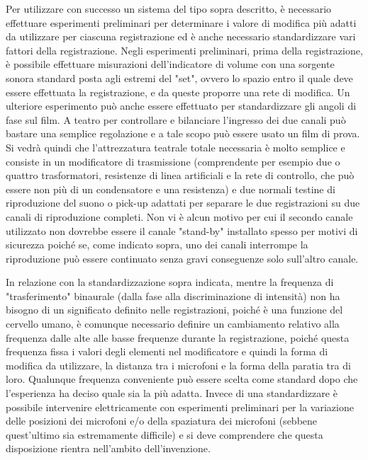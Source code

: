 \documentclass[11pt]{article}
\begin{document}
\begin{multicols*}{2}
Per utilizzare con successo un sistema del tipo sopra descritto, è necessario effettuare esperimenti preliminari per determinare i valore di modifica più adatti da utilizzare per ciascuna registrazione ed è anche necessario standardizzare vari fattori della registrazione. Negli esperimenti preliminari, prima della registrazione, è possibile effettuare misurazioni dell'indicatore di volume con una sorgente sonora standard posta agli estremi del "set", ovvero lo spazio entro il quale deve essere effettuata la registrazione, e da queste proporre una rete di modifica. Un ulteriore esperimento può anche essere effettuato per standardizzare gli angoli di fase sul film. A teatro per controllare e bilanciare l’ingresso dei due canali può bastare una semplice regolazione e a tale scopo può essere usato un film di prova. Si vedrà quindi che l'attrezzatura teatrale totale necessaria è molto semplice e consiste in un modificatore di trasmissione (comprendente per esempio due o quattro trasformatori, resistenze di linea artificiali e la rete di controllo, che può essere non più di un condensatore e una resistenza) e due normali testine di riproduzione del suono o pick-up adattati per separare le due registrazioni su due canali di riproduzione completi. Non vi è alcun motivo per cui il secondo canale utilizzato non dovrebbe essere il canale "stand-by" installato spesso per motivi di sicurezza poiché se, come indicato sopra, uno dei canali interrompe la riproduzione può essere continuato senza gravi conseguenze solo sull'altro canale.

In relazione con la standardizzazione sopra indicata, mentre la frequenza di "trasferimento" binaurale (dalla fase alla discriminazione di intensità) non ha bisogno di un significato definito nelle registrazioni, poiché è una funzione del cervello umano, è comunque necessario definire un cambiamento relativo alla frequenza dalle alte alle basse frequenze durante la registrazione, poiché questa frequenza fissa i valori degli elementi nel modificatore e quindi la forma di modifica da utilizzare, la distanza tra i microfoni e la forma della paratia tra di loro. Qualunque frequenza conveniente può essere scelta come standard dopo che l'esperienza ha deciso quale sia la più adatta. Invece di una standardizzare è possibile intervenire elettricamente con esperimenti preliminari per la variazione delle posizioni dei microfoni e/o della spaziatura dei microfoni (sebbene quest'ultimo sia estremamente difficile) e si deve comprendere che questa disposizione rientra nell'ambito dell’invenzione.


\end{multicols*}
\end{document}
